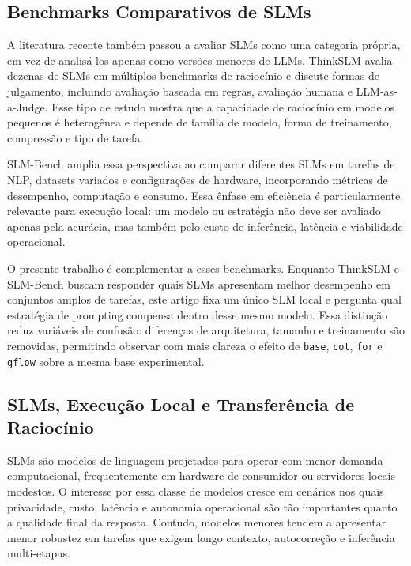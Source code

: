 \documentclass[12pt]{article}
\begin{document}
\subsection{Benchmarks Comparativos de SLMs}

A literatura recente também passou a avaliar SLMs como uma categoria própria, em vez de analisá-los apenas como versões menores de LLMs. ThinkSLM \cite{thinkslm2025} avalia dezenas de SLMs em múltiplos benchmarks de raciocínio e discute formas de julgamento, incluindo avaliação baseada em regras, avaliação humana e LLM-as-a-Judge. Esse tipo de estudo mostra que a capacidade de raciocínio em modelos pequenos é heterogênea e depende de família de modelo, forma de treinamento, compressão e tipo de tarefa.

SLM-Bench \cite{slmbench2025} amplia essa perspectiva ao comparar diferentes SLMs em tarefas de NLP, datasets variados e configurações de hardware, incorporando métricas de desempenho, computação e consumo. Essa ênfase em eficiência é particularmente relevante para execução local: um modelo ou estratégia não deve ser avaliado apenas pela acurácia, mas também pelo custo de inferência, latência e viabilidade operacional.

O presente trabalho é complementar a esses benchmarks. Enquanto ThinkSLM e SLM-Bench buscam responder quais SLMs apresentam melhor desempenho em conjuntos amplos de tarefas, este artigo fixa um único SLM local e pergunta qual estratégia de prompting compensa dentro desse mesmo modelo. Essa distinção reduz variáveis de confusão: diferenças de arquitetura, tamanho e treinamento são removidas, permitindo observar com mais clareza o efeito de \texttt{base}, \texttt{cot}, \texttt{for} e \texttt{gflow} sobre a mesma base experimental.

\subsection{SLMs, Execução Local e Transferência de Raciocínio}

SLMs são modelos de linguagem projetados para operar com menor demanda computacional, frequentemente em hardware de consumidor ou servidores locais modestos. O interesse por essa classe de modelos cresce em cenários nos quais privacidade, custo, latência e autonomia operacional são tão importantes quanto a qualidade final da resposta. Contudo, modelos menores tendem a apresentar menor robustez em tarefas que exigem longo contexto, autocorreção e inferência multi-etapas.
\end{document}
